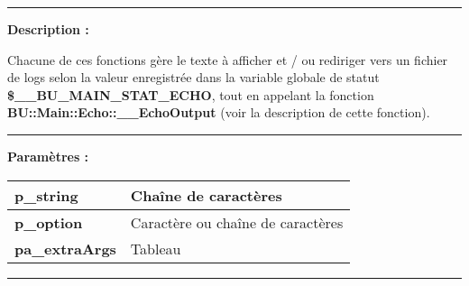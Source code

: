\documentclass[a4paper,10pt]{article}
\begin{document}
\par\noindent\rule{\textwidth}{0.4pt}

\begin{justify}
    \textbf{Description :}

    Chacune de ces fonctions gère le texte à afficher et / ou rediriger vers un fichier de logs selon la valeur enregistrée dans la variable globale de statut \textbf{\color{vars}\$\_\_BU\_MAIN\_STAT\_ECHO}, tout en appelant la fonction \textbf{\color{func}BU::Main::Echo::\_\_EchoOutput} (voir la description de cette fonction).
\end{justify}


\par\noindent\rule{\textwidth}{0.4pt}

\begin{justify}
    \textbf{Paramètres :}

    \begin{tabular}{|l|l|}
        \hline
        \textbf{\color{vars}p\_string} & Chaîne de caractères\\
        \hline
        \textbf{\color{vars}p\_option} & Caractère ou chaîne de caractères\\
        \hline
        \textbf{\color{vars}pa\_extraArgs} & Tableau\\
        \hline
    \end{tabular}
\end{justify}

\setlength{\parskip}{2em}


\par\noindent\rule{\textwidth}{0.4pt}
\end{document}
